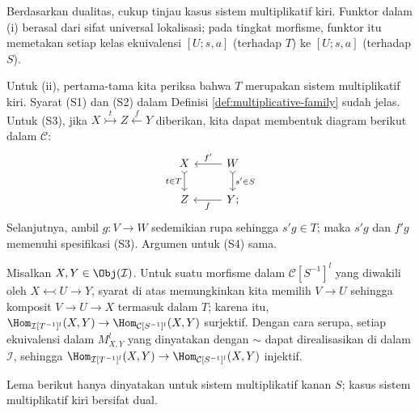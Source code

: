 \begin{bukti}
	Berdasarkan dualitas, cukup tinjau kasus sistem multiplikatif kiri. Funktor
	dalam (i) berasal dari sifat universal lokalisasi; pada tingkat morfisme,
	funktor itu memetakan setiap kelas ekuivalensi $[U; s, a]$ (terhadap $T$)
	ke $[U; s, a]$ (terhadap $S$).

	Untuk (ii), pertama-tama kita periksa bahwa $T$ merupakan sistem
	multiplikatif kiri. Syarat (S1) dan (S2) dalam Definisi
	\ref{def:multiplicative-family} sudah jelas. Untuk (S3), jika
	$X \stackrel{t}{\rightarrowtail} Z \stackrel{f}{\leftarrow} Y$
	diberikan, kita dapat membentuk diagram berikut dalam $\mathcal{C}$:
	\[\begin{tikzcd}
		X \arrow[rightarrowtail, d, "{t \in T}"'] & W \arrow[l, "{f'}"'] \arrow[rightarrowtail, d, "{s' \in S}"] \\
		Z & Y \arrow[l, "f"] ;
	\end{tikzcd}\]
	Selanjutnya, ambil $g: V \to W$ sedemikian rupa sehingga $s' g \in T$;
	maka $s'g$ dan $f'g$ memenuhi spesifikasi (S3). Argumen untuk (S4) sama.

	Misalkan $X, Y \in \Obj(\mathcal{I})$. Untuk suatu morfisme dalam
	$\mathcal{C}[S^{-1}]^l$ yang diwakili oleh
	$X \leftarrowtail U \to Y$, syarat di atas memungkinkan kita memilih
	$V \to U$ sehingga komposit $V \to U \to X$ termasuk dalam $T$; karena
	itu, $\Hom_{\mathcal{I}[T^{-1}]^l}(X, Y) \to
	\Hom_{\mathcal{C}[S^{-1}]^l}(X, Y)$ surjektif. Dengan cara serupa, setiap
	ekuivalensi dalam $M_{X, Y}^l$ yang dinyatakan dengan $\sim$ dapat
	direalisasikan di dalam
	$\mathcal{I}$, sehingga $\Hom_{\mathcal{I}[T^{-1}]^l}(X, Y) \to
	\Hom_{\mathcal{C}[S^{-1}]^l}(X, Y)$ injektif.
\end{bukti}

Lema berikut hanya dinyatakan untuk sistem multiplikatif kanan $S$; kasus
sistem multiplikatif kiri bersifat dual.

